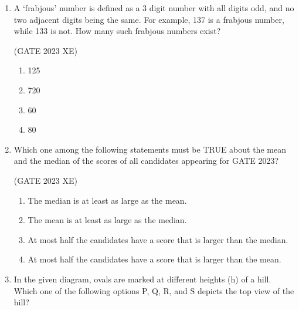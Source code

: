 \documentclass[journal,12pt,onecolumn]{IEEEtran}
\begin{document}
\begin{enumerate}
\begin{multicols}{4}
\begin{enumerate}
\end{enumerate}

\end{multicols}

\item A ‘frabjous’ number is defined as a 3 digit number with all digits odd, and no two 
adjacent digits being the same. For example, 137 is a frabjous number, while 133 
is not. How many such frabjous numbers exist?

\hfill{(GATE 2023 XE)}

\begin{multicols}{4}

\begin{enumerate}

\item 125

\item 720

\item 60

\item 80

\end{enumerate}

\end{multicols}

\item Which one among the following statements must be TRUE about the mean and 
the  median of the scores of all candidates appearing for GATE 2023?

\hfill{(GATE 2023 XE)}

\begin{multicols}{2}

\begin{enumerate}

\item The median is at least as large as the mean.

\item The mean is at least as large as the median.

\item At most half the candidates have a score that is larger than the median.

\item At most half the candidates have a score that is larger than the mean.

\end{enumerate}

\end{multicols}


\item In the given diagram, ovals are marked at different heights (h) of a hill. Which one 
of the following options P, Q, R, and S depicts the top view of the hill?


\end{enumerate}
\end{document}

